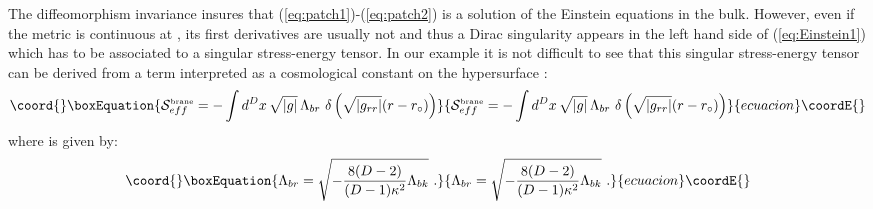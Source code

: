 \documentclass[a4paper,12pt]{article}
\def\action{{\cal S}}
\begin{document}
The diffeomorphism invariance insures that (\ref{eq:patch1})-(\ref{eq:patch2})
is a solution of the Einstein equations in the bulk. However, even if the
metric is continuous at \coordHE{}, its first derivatives are usually not and thus
a Dirac singularity appears in the left hand side of (\ref{eq:Einstein1})
which has to be associated to a singular stress-energy tensor. In our example
it is not difficult to see that this singular stress-energy tensor can be derived
from a term interpreted as a cosmological constant on the hypersurface \coordHE{}:
%
\begin{equation}\coord{}\boxEquation{
	\label{eq:Lambdabr}
\action^{\mbox{\tiny brane}}_{eff}
= - \int d^{D} x\, \sqrt{|g|}\,
 \Lambda_{br}\
\delta \left(
\sqrt{|g_{rr}|}(r-r_\circ) \right)
}{
	\action^{\mbox{\tiny brane}}_{eff}
= - \int d^{D} x\, \sqrt{|g|}\,
 \Lambda_{br}\
\delta \left(
\sqrt{|g_{rr}|}(r-r_\circ) \right)
}{ecuacion}\coordE{}\end{equation}
%
where \coordHE{} is given by:
\begin{equation}\coord{}\boxEquation{
\Lambda_{br}
=\sqrt{-\frac{8(D-2)}{(D-1)\kappa^2} \Lambda_{bk}}
\ .
}{
\Lambda_{br}
=\sqrt{-\frac{8(D-2)}{(D-1)\kappa^2} \Lambda_{bk}}
\ .
}{ecuacion}\coordE{}\end{equation}
%
\end{document}
